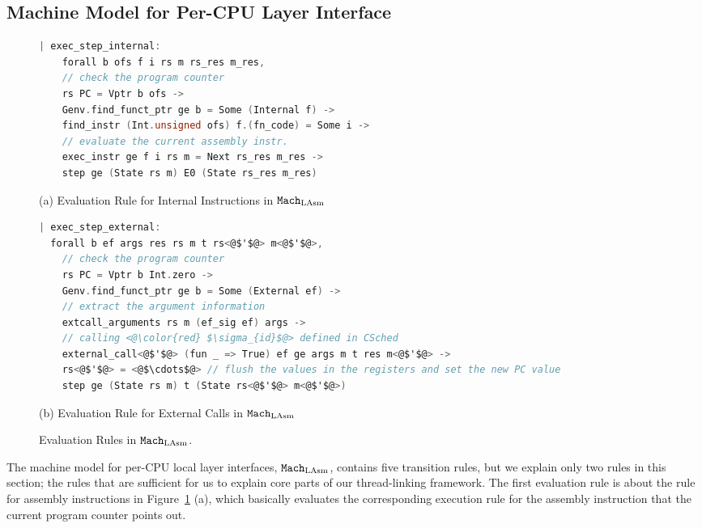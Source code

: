 \subsection{Machine Model for Per-CPU Layer Interface}
\label{chapter:linking:subsec:cpu-local-layer-interface}


\begin{figure}
\begin{lstlisting}[language=C, deletekeywords={unsigned, struct}]
| exec_step_internal:
    forall b ofs f i rs m rs_res m_res,
    // check the program counter
    rs PC = Vptr b ofs ->
    Genv.find_funct_ptr ge b = Some (Internal f) ->
    find_instr (Int.unsigned ofs) f.(fn_code) = Some i ->
    // evaluate the current assembly instr.         
    exec_instr ge f i rs m = Next rs_res m_res ->
    step ge (State rs m) E0 (State rs_res m_res)
\end{lstlisting}
\begin{center}
(a) Evaluation Rule for Internal Instructions in ${\mathrm{\texttt{Mach}}}_{\mathrm{LAsm}}$
\end{center}
\begin{lstlisting}[language=C]
| exec_step_external:
  forall b ef args res rs m t rs<@$'$@> m<@$'$@>,
    // check the program counter  
    rs PC = Vptr b Int.zero ->
    Genv.find_funct_ptr ge b = Some (External ef) ->
    // extract the argument information
    extcall_arguments rs m (ef_sig ef) args ->
    // calling <@\color{red} $\sigma_{id}$@> defined in CSched
    external_call<@$'$@> (fun _ => True) ef ge args m t res m<@$'$@> ->
    rs<@$'$@> = <@$\cdots$@> // flush the values in the registers and set the new PC value
    step ge (State rs m) t (State rs<@$'$@> m<@$'$@>)
\end{lstlisting}
\begin{center}
(b) Evaluation Rule for External Calls in ${\mathrm{\texttt{Mach}}}_{\mathrm{LAsm}}$
\end{center}
\caption{Evaluation Rules in ${\mathrm{\texttt{Mach}}}_{\mathrm{LAsm}}$.}
\label{fig:chapter:linking:eval-rule-in-lasm}
\end{figure}

The machine model for per-CPU local layer interfaces,
${\mathrm{\texttt{Mach}}}_{\mathrm{LAsm}}$, contains five transition rules, 
but we explain only two rules in this section; the rules 
that are sufficient for us to explain core parts of our thread-linking framework.
The first evaluation rule is 
about the rule for assembly instructions in Figure~\ref{fig:chapter:linking:eval-rule-in-lasm} (a), 
which basically evaluates the corresponding execution 
rule for the assembly instruction that the current program counter points out. 

